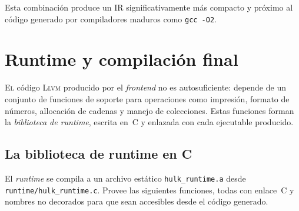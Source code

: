 \documentclass[11pt,a4paper,oneside,openany]{report}
\newcommand{\code}[1]{\texttt{#1}}
\newcommand{\llvm}{\textsc{Llvm}}
\begin{document}
Esta combinación produce un IR significativamente más compacto y próximo al código
generado por compiladores maduros como \code{gcc -O2}.

\chapter{Runtime y compilación final}
\label{cap:rt}

\lettrine[lines=2,findent=2pt,nindent=0pt]{E}{l} código \llvm{} producido por el
\textit{frontend} no es autosuficiente: depende de un conjunto de funciones de
soporte para operaciones como impresión, formato de números, allocación de cadenas
y manejo de colecciones. Estas funciones forman la \textit{biblioteca de runtime},
escrita en~C y enlazada con cada ejecutable producido.

\section{La biblioteca de runtime en C}

El \textit{runtime} se compila a un archivo estático \code{hulk\_runtime.a} desde
\code{runtime/hulk\_runtime.c}. Provee las siguientes funciones, todas con enlace~C
y nombres no decorados para que sean accesibles desde el código generado.
\end{document}
